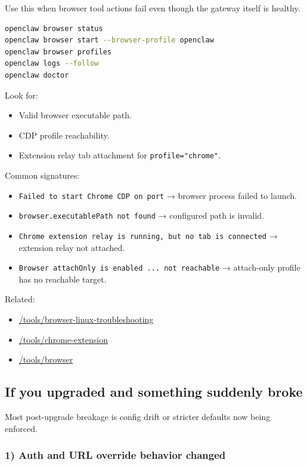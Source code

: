 Use this when browser tool actions fail even though the gateway itself is healthy.

\begin{lstlisting}[language=bash]
openclaw browser status
openclaw browser start --browser-profile openclaw
openclaw browser profiles
openclaw logs --follow
openclaw doctor
\end{lstlisting}


Look for:

\begin{itemize}
  \item Valid browser executable path.
  \item CDP profile reachability.
  \item Extension relay tab attachment for \texttt{profile="chrome"}.
\end{itemize}


Common signatures:

\begin{itemize}
  \item \texttt{Failed to start Chrome CDP on port} → browser process failed to launch.
  \item \texttt{browser.executablePath not found} → configured path is invalid.
  \item \texttt{Chrome extension relay is running, but no tab is connected} → extension relay not attached.
  \item \texttt{Browser attachOnly is enabled ... not reachable} → attach-only profile has no reachable target.
\end{itemize}


Related:

\begin{itemize}
  \item \href{/tools/browser-linux-troubleshooting}{/tools/browser-linux-troubleshooting}
  \item \href{/tools/chrome-extension}{/tools/chrome-extension}
  \item \href{/tools/browser}{/tools/browser}
\end{itemize}


\subsection{If you upgraded and something suddenly broke}


Most post-upgrade breakage is config drift or stricter defaults now being enforced.

\subsubsection{1) Auth and URL override behavior changed}



